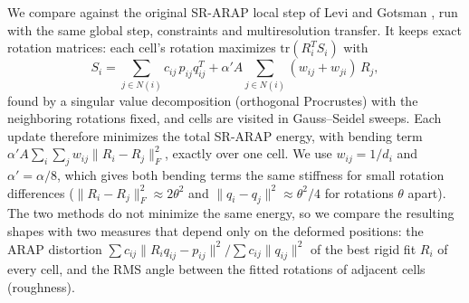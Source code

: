 \documentclass{birkjour}
\theoremstyle{remark}
\numberwithin{equation}{section}
\begin{document}
We compare against the original SR-ARAP local step of Levi and Gotsman \cite{Levi2015}, run with the same global step, constraints and multiresolution transfer. It keeps exact rotation matrices: each cell's rotation maximizes $\mathrm{tr}(R_i^T S_i)$ with
\begin{equation*}
S_i = \sum_{j \in N(i)} c_{ij} \, p_{ij} q_{ij}^T + \alpha' A \sum_{j \in N(i)} (w_{ij} + w_{ji}) \, R_j ,
\end{equation*}
found by a singular value decomposition (orthogonal Procrustes) with the neighboring rotations fixed, and cells are visited in Gauss--Seidel sweeps. Each update therefore minimizes the total SR-ARAP energy, with bending term $\alpha' A \sum_i \sum_j w_{ij} \| R_i - R_j \|_F^2$, exactly over one cell. We use $w_{ij} = 1/d_i$ and $\alpha' = \alpha / 8$, which gives both bending terms the same stiffness for small rotation differences ($\|R_i - R_j\|_F^2 \approx 2 \theta^2$ and $\|q_i - q_j\|^2 \approx \theta^2 / 4$ for rotations $\theta$ apart). The two methods do not minimize the same energy, so we compare the resulting shapes with two measures that depend only on the deformed positions: the ARAP distortion $\sum c_{ij} \| R_i q_{ij} - p_{ij} \|^2 / \sum c_{ij} \|q_{ij}\|^2$ of the best rigid fit $R_i$ of every cell, and the RMS angle between the fitted rotations of adjacent cells (roughness).
\end{document}
